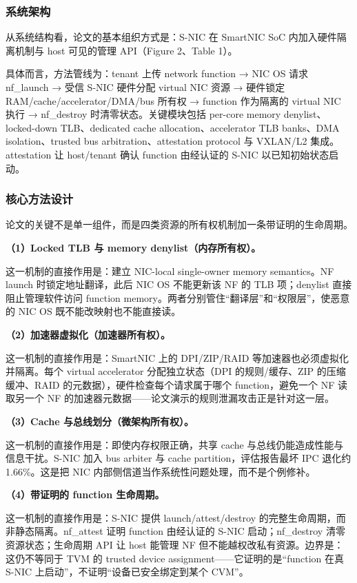\documentclass[11pt]{ctexart}
\begin{document}
\subsubsection{系统架构}
从系统结构看，论文的基本组织方式是：S-NIC 在 SmartNIC SoC 内加入硬件隔离机制与 host 可见的管理 API（Figure 2、Table 1）。\par
具体而言，方法管线为：tenant 上传 network function → NIC OS 请求 nf\_launch → 受信 S-NIC 硬件分配 virtual NIC 资源 → 硬件锁定 RAM/cache/accelerator/DMA/bus 所有权 → function 作为隔离的 virtual NIC 执行 → nf\_destroy 时清零状态。关键模块包括 per-core memory denylist、locked-down TLB、dedicated cache allocation、accelerator TLB banks、DMA isolation、trusted bus arbitration、attestation protocol 与 VXLAN/L2 集成。attestation 让 host/tenant 确认 function 由经认证的 S-NIC 以已知初始状态启动。\par
\subsubsection{核心方法设计}
论文的关键不是单一组件，而是四类资源的所有权机制加一条带证明的生命周期。\par
\noindent\textbf{（1）Locked TLB 与 memory denylist（内存所有权）。}\par
这一机制的直接作用是：建立 NIC-local single-owner memory semantics。NF launch 时锁定地址翻译，此后 NIC OS 不能更新该 NF 的 TLB 项；denylist 直接阻止管理软件访问 function memory。两者分别管住“翻译层”和“权限层”，使恶意的 NIC OS 既不能改映射也不能直接读。\par
\noindent\textbf{（2）加速器虚拟化（加速器所有权）。}\par
这一机制的直接作用是：SmartNIC 上的 DPI/ZIP/RAID 等加速器也必须虚拟化并隔离。每个 virtual accelerator 分配独立状态（DPI 的规则/缓存、ZIP 的压缩缓冲、RAID 的元数据），硬件检查每个请求属于哪个 function，避免一个 NF 读取另一个 NF 的加速器元数据——论文演示的规则泄漏攻击正是针对这一层。\par
\noindent\textbf{（3）Cache 与总线划分（微架构所有权）。}\par
这一机制的直接作用是：即使内存权限正确，共享 cache 与总线仍能造成性能与信息干扰。S-NIC 加入 bus arbiter 与 cache partition，评估报告最坏 IPC 退化约 1.66\%。这是把 NIC 内部侧信道当作系统性问题处理，而不是个例修补。\par
\noindent\textbf{（4）带证明的 function 生命周期。}\par
这一机制的直接作用是：S-NIC 提供 launch/attest/destroy 的完整生命周期，而非静态隔离。nf\_attest 证明 function 由经认证的 S-NIC 启动；nf\_destroy 清零资源状态；生命周期 API 让 host 能管理 NF 但不能越权改私有资源。边界是：这仍不等同于 TVM 的 trusted device assignment——它证明的是“function 在真 S-NIC 上启动”，不证明“设备已安全绑定到某个 CVM”。\par
\end{document}
